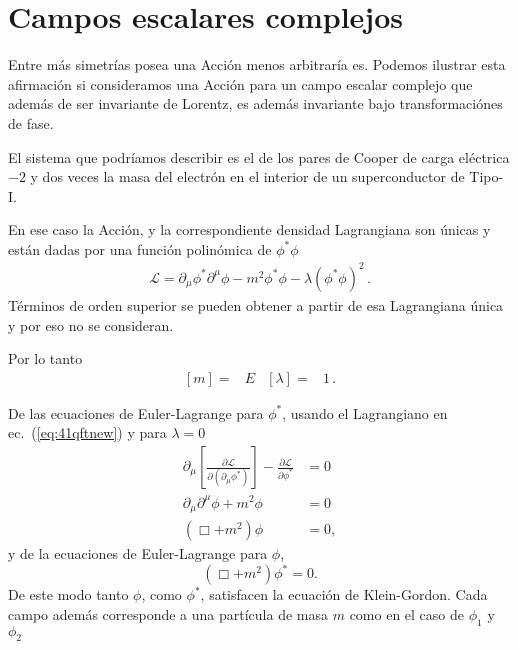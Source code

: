 \section{Campos escalares complejos}
Entre más simetrías posea una Acción menos arbitraría es. Podemos
ilustrar esta afirmación si consideramos una Acción para un campo escalar
complejo que además de ser invariante de Lorentz, es además invariante
bajo transformaciónes de fase.

El sistema que podríamos describir es el de los pares de Cooper de carga eléctrica $-2$ y dos veces la masa del electrón en el interior de un superconductor de Tipo-I.



\begin{frame}


En ese caso la Acción, y la correspondiente densidad Lagrangiana son
únicas y están dadas por una función polinómica de $\phi^{*}\phi$
\begin{align}
  \label{eq:41qftnew}
  \mathcal{L}=\partial_{\mu}\phi^{*} \partial^{\mu}\phi-m^2\phi^{*}\phi-\lambda \left(\phi^{*}\phi \right)^2\,.
\end{align}
Términos de orden superior se pueden obtener a partir de esa
Lagrangiana única y por eso no se consideran. 
\end{frame}


Por lo tanto
\begin{align}
  \left[ m \right]=&E& \left[ \lambda \right]=&1\,.
\end{align}






De las ecuaciones de Euler-Lagrange para $\phi^*$, usando el Lagrangiano en ec.~(\ref{eq:41qftnew}) y para $\lambda=0$
\begin{align}
  \partial_\mu\left[
      \frac{\partial\mathcal{L}}{\partial(\partial_\mu\phi^*)}\right]-\frac{\partial\mathcal{L}}{\partial\phi^*}&=0\nonumber\\
    \partial_\mu\partial^\mu\phi+m^2\phi&=0\nonumber\\
    \label{eq:43qft}
    (\Box+m^2)\phi&=0,
\end{align}
y de la ecuaciones de Euler-Lagrange para $\phi$,
\begin{equation}
  \label{eq:44qft}
    (\Box+m^2)\phi^*=0.
\end{equation}
De este modo tanto $\phi$, como $\phi^*$, satisfacen la ecuación de Klein-Gordon. Cada campo además corresponde a una partícula de masa $m$ como en el caso de $\phi_1$ y $\phi_2$

